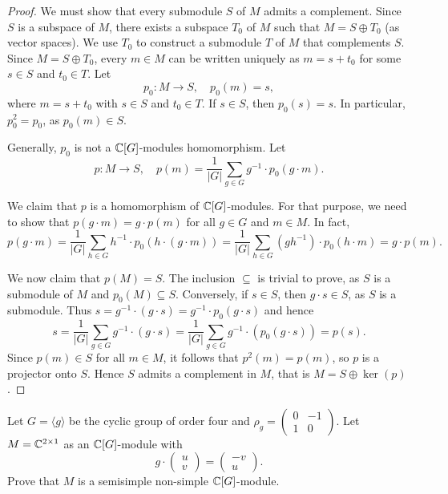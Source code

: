 \begin{proof}
We must show that every submodule $S$ of $M$ admits a complement. 
Since $S$ is a subspace of $M$, there exists a subspace $T_0$ of $M$ 
such that $M=S\oplus T_0$ (as vector spaces). We use 
$T_0$ to construct a submodule $T$ of $M$ that complements $S$. Since $M=S\oplus T_0$, 
every $m\in M$ can be written uniquely as $m=s+t_0$ for some $s\in S$ and $t_0\in T$. 
Let 
\[
p_0\colon M\to S,\quad
p_0(m)=s,
\]
where $m=s+t_0$ with $s\in S$ and $t_0\in T$. 
If $s\in S$, then $p_0(s)=s$. In particular, $p_0^2=p_0$, as 
$p_0(m)\in S$. 

Generally, $p_0$ is not a $\mathbb{C}[G]$-modules homomorphism. 
Let 
\[
p\colon M\to S,\quad
p(m)=\frac{1}{|G|}\sum_{g\in G}g^{-1}\cdot p_0(g\cdot m).
\]

We claim that $p$ is a homomorphism of $\mathbb{C}[G]$-modules. For that purpose, we need to show that 
$p(g\cdot m)=g\cdot p(m)$ for all $g\in G$ and $m\in M$. In fact, 
\[
p(g\cdot m)=\frac{1}{|G|}\sum_{h\in G}h^{-1}\cdot p_0(h\cdot (g\cdot m))
=\frac{1}{|G|}\sum_{h\in G}(gh^{-1})\cdot p_0(h\cdot m)=g\cdot p(m).
\]

We now claim that $p(M)=S$. The inclusion $\subseteq$ is trivial to prove, as $S$ is a submodule of $M$ 
and $p_0(M)\subseteq S$. Conversely, if $s\in S$, then $g\cdot s\in S$, as 
$S$ is a submodule. Thus 
$s=g^{-1}\cdot (g\cdot s)=g^{-1}\cdot p_0(g\cdot s)$ and hence 
\[
s=\frac{1}{|G|}\sum_{g\in G}g^{-1}\cdot (g\cdot s)=\frac{1}{|G|}\sum_{g\in G}g^{-1}\cdot (p_0(g\cdot s))=p(s).
\]
Since $p(m)\in S$ for all $m\in M$, it follows that $p^2(m)=p(m)$, so $p$ is a projector onto $S$. 
Hence $S$ admits a complement in $M$, that is $M=S\oplus\ker(p)$.
\end{proof}

\begin{exercise}
Let $G=\langle g\rangle$ be the cyclic group 
of order four and $\rho_g=\begin{pmatrix}
0&-1\\
1&0\end{pmatrix}$. 
Let $M=\mathbb{C}^{2\times 1}$ as an $\mathbb{C}[G]$-module with 
\[
g\cdot\begin{pmatrix}u\\v\end{pmatrix}
=\begin{pmatrix}-v\\u\end{pmatrix}.
\]
Prove that $M$ is a semisimple non-simple $\mathbb{C}[G]$-module.
\end{exercise}

